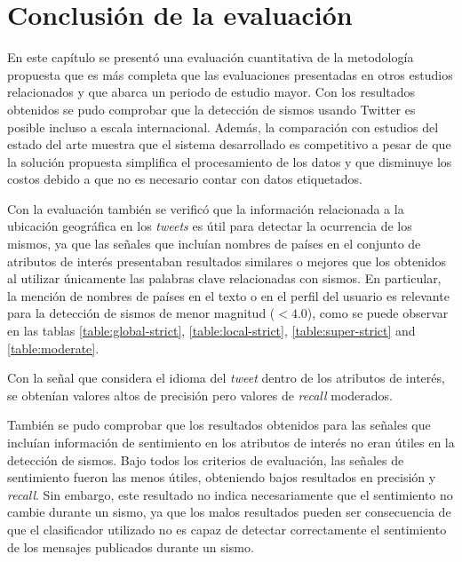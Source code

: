 \section{Conclusión de la evaluación}
\label{sec:conclusionEval}

En este capítulo se presentó una evaluación cuantitativa de la metodología propuesta que es más completa que las evaluaciones presentadas en otros estudios relacionados y que abarca un periodo de estudio mayor. Con los resultados obtenidos se pudo comprobar que la detección de sismos usando Twitter es posible incluso a escala internacional. Además, la comparación con estudios del estado del arte muestra que el sistema desarrollado es competitivo a pesar de que la solución propuesta simplifica el procesamiento de los datos y que disminuye los costos debido a que no es necesario contar con datos etiquetados.

Con la evaluación también se verificó que la información relacionada a la ubicación geográfica en los \textit{tweets} es útil para detectar la ocurrencia de los mismos, ya que las señales que incluían nombres de países en el conjunto de atributos de interés presentaban resultados similares o mejores que los obtenidos al utilizar únicamente las palabras clave relacionadas con sismos. En particular, la mención de nombres de países en el texto o en el perfil del usuario es relevante para la detección de sismos de menor magnitud ($< 4.0$), como se puede observar en las tablas \ref{table:global-strict}, \ref{table:local-strict}, \ref{table:super-strict} and \ref{table:moderate}.

Con la señal que considera el idioma del \textit{tweet} dentro de los atributos de interés, se obtenían valores altos de precisión pero valores de \textit{recall} moderados.

También se pudo comprobar que los resultados obtenidos para las señales que incluían información de sentimiento en los atributos de interés no eran útiles en la detección de sismos. Bajo todos los criterios de evaluación, las señales de sentimiento fueron las menos útiles, obteniendo bajos resultados en precisión y \textit{recall}. Sin embargo, este resultado no indica necesariamente que el sentimiento no cambie durante un sismo, ya que los malos resultados pueden ser consecuencia de que el clasificador utilizado no es capaz de detectar correctamente el sentimiento de los mensajes publicados durante un sismo.




 


